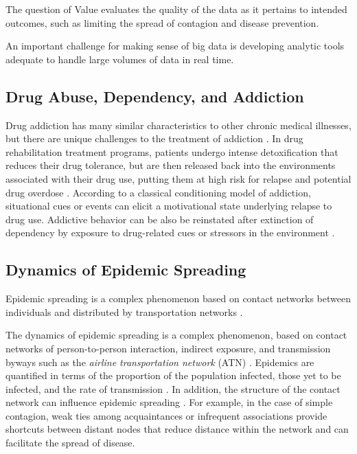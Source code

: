 \documentclass[sigconf]{acmart}
\begin{document}
The question of 
Value evaluates the quality of the data as it pertains to intended outcomes, such 
as limiting the spread of contagion and disease prevention. 

An important challenge for making sense of big data is developing analytic 
tools adequate to handle large volumes of data in real time.

\subsection{Drug Abuse, Dependency, and Addiction}

Drug addiction has many similar characteristics to other chronic medical 
illnesses, but there are unique challenges to the treatment of addiction
\cite{marsch12, swendson16}. In drug rehabilitation treatment programs, 
patients undergo intense detoxification that reduces their drug tolerance, but 
are then released back into the environments associated with their drug use, 
putting them at high risk for relapse and potential drug overdose 
\cite{johnson11}. According to a classical conditioning model of addiction, 
situational cues or events can elicit a motivational state underlying relapse 
to drug use. Addictive behavior can be also be reinstated after extinction of 
dependency by exposure to drug-related cues or stressors in the environment 
\cite{shaham03}. 


\subsection{Dynamics of Epidemic Spreading}

Epidemic spreading is a complex phenomenon based on contact networks between 
individuals and distributed by transportation networks \cite{Colizza06}.

The dynamics of epidemic spreading is a complex phenomenon, based on contact 
networks of person-to-person interaction, indirect exposure, and transmission 
byways such as the {\it airline transportation network} (ATN) \cite{Colizza06}. 
Epidemics are quantified in terms of the proportion of the population infected, 
those yet to be infected, and the rate of transmission \cite{hethcote00}. In 
addition, the structure of the contact network can influence epidemic spreading 
\cite{pastor01}. For example, in the case of simple contagion, weak ties among 
acquaintances or infrequent associations provide shortcuts between distant nodes 
that reduce distance within the network \cite{granovetter73} and can facilitate 
the spread of disease. 
\end{document}
